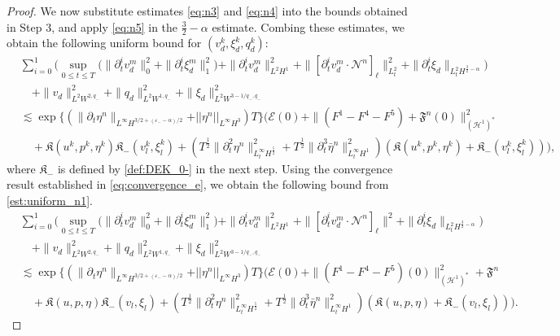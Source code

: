 \documentclass[letterpaper,reqno,10pt,twoside]{amsart}
\theoremstyle{definition}
\theoremstyle{remark}
\def\p{\partial}
\begin{document}
\begin{proof}
		We now substitute estimates \eqref{eq:n3} and \eqref{eq:n4} into the bounds obtained in Step 3, and apply \eqref{eq:n5} in the 
		$\frac{3}{2}-\alpha$ estimate. 
		Combing these estimates, we obtain the following uniform bound for $(v_{d}^{k},\xi_{d}^{k},q_{d}^{k})$:
		\begin{equation}\label{est:uniform_n1}
			\begin{aligned}
				&\sum_{i=0}^{1}\bigg(\sup_{0\le t\le T}
				\bigl(
				\|\partial_{t}^{i}v_{d}^{m}\|_{0}^{2}
				+\|\partial_{t}^{i}\xi_{d}^{m}\|_{1}^{2}
				\bigr)
				+\|\partial_{t}^{i}v_{d}^{m}\|_{L^{2}H^{1}}^{2}+\|[\p_{t}^{i}v_{d}^{m}\cdot \mathcal{N}^{n}]_{\ell}\|_{L_t^2}^{2}+\|\p_{t}^{i}\xi_{d}\|_{L_{t}^{2}H^{\frac{3}{2}-\alpha}}\bigg)\\
				&\quad+\|v_{d}\|_{L^2W^{2,q_-}}^2+\|q_{d}\|_{L^2W^{1,q_-}}^2+\|\xi_{d}\|_{L^2W^{3-1/q_-,q_-}}^2\\
				&\lesssim\exp\{(\|\p_t\eta^{n}\|_{L^\infty H^{3/2+(\varepsilon_--\alpha)/2}}+\vert \vert \eta^{n}\vert \vert_{L^{\infty}H^{3}})T\}\bigg(\mathcal{E}(0)+\|(F^1-F^4-F^5) +\mathfrak{F}^{n}(0)\|_{(\mathcal{H}^1)^\ast}^2\\
				&\quad+\mathfrak{K}(u^{k},p^{k},\eta^{k})\mathfrak{K}_{-}(v_{l}^{k},\xi_{l}^{k})+(T^{\frac{1}{2}}\|\p_{t}^{2}\eta^{n}\|^{2}_{L_{t}^{\infty}H^{\frac{5}{2}}}+T^{\frac{1}{2}}\|\p_{t}^{3}\bar{\eta}^{n}\|_{L_{t}^{\infty}H^{1}}^{2})(\mathfrak{K}(u^{k},p^{k},\eta^{k})+\mathfrak{K}_{-}(v_{l}^{k},\xi_{l}^{k}))\bigg),
			\end{aligned}
		\end{equation}
		where $\mathfrak{K}_{-}$ is defined by \eqref{def:DEK_0-} in the next step.
		\noindent Using the convergence result established in \eqref{eq:convergence_e}, we obtain the following bound from \eqref{est:uniform_n1}.
		\begin{equation}\label{est:uniform_n2}
			\begin{aligned}
				&\sum_{i=0}^{1}\bigg(\sup_{0\le t\le T}
				\bigl(
				\|\partial_{t}^{i}v_{d}^{m}\|_{0}^{2}
				+\|\partial_{t}^{i}\xi_{d}^{m}\|_{1}^{2}
				\bigr)
				+\|\partial_{t}^{i}v_{d}^{m}\|_{L^{2}H^{1}}^{2}+\|[\p_{t}^{i}v_{d}^{m}\cdot \mathcal{N}^{n}]_{\ell}\|^{2}+\|\p_{t}^{i}\xi_{d}\|_{L_{t}^{2}H^{\frac{3}{2}-\alpha}}\bigg)\\
				&\quad+\|v_{d}\|_{L^2W^{2,q_-}}^2+\|q_{d}\|_{L^2W^{1,q_-}}^2+\|\xi_{d}\|_{L^2W^{3-1/q_-,q_-}}^2\\
				&\lesssim\exp\{(\|\p_t\eta^{n}\|_{L^\infty H^{3/2+(\varepsilon_--\alpha)/2}}+\vert \vert \eta^{n}\vert \vert_{L^{\infty}H^{3}})T\}\bigg(\mathcal{E}(0)+\|(F^1-F^4-F^5)(0)\|_{(\mathcal{H}^1)^\ast}^2 +\mathfrak{F}^{n}\\
				&\quad+\mathfrak{K}(u,p,\eta)\mathfrak{K}_{-}(v_{l},\xi_{l})+(T^{\frac{1}{2}}\|\p_{t}^{2}\eta^{n}\|^{2}_{L_{t}^{\infty}H^{\frac{5}{2}}}+T^{\frac{1}{2}}\|\p_{t}^{3}\bar{\eta}^{n}\|_{L_{t}^{\infty}H^{1}}^{2})(\mathfrak{K}(u,p,\eta)+\mathfrak{K}_{-}(v_{l},\xi_{l}))\bigg)
				.
			\end{aligned}
		\end{equation} 
		

\end{proof}
\end{document}

